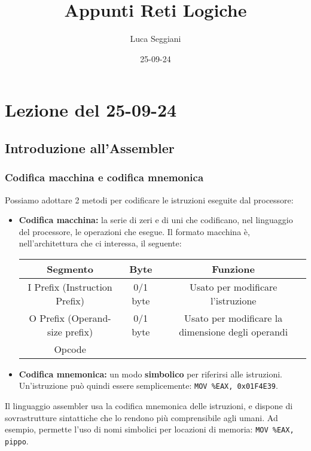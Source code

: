 \documentclass[a4paper,11pt]{article}
\title{Appunti Reti Logiche}
\author{Luca Seggiani}
\date{25-09-24}
\begin{document}
\section{Lezione del 25-09-24}

\thispagestyle{empty}
\pagestyle{fancy}

\subsection{Introduzione all'Assembler}

\subsubsection{Codifica macchina e codifica mnemonica}
Possiamo adottare 2 metodi per codificare le istruzioni eseguite dal processore:

\begin{itemize}
	\item \textbf{Codifica macchina:} la serie di zeri e di uni che codificano, nel linguaggio del processore, le operazioni che esegue.
		Il formato macchina è, nell'architettura che ci interessa, il seguente:

		\begin{table}[h!]
			\center {}
			\begin{tabular} { c | c | c }
				\bfseries Segmento & \bfseries Byte & \bfseries Funzione \\
				\hline 
				I Prefix (Instruction Prefix) & 0/1 byte & Usato per modificare l'istruzione \\ 
				O Prefix (Operand-size prefix) & 0/1 byte & Usato per modificare la dimensione degli operandi \\
				Opcode &
			\end{tabular}
		\end{table}

	\item \textbf{Codifica mnemonica:} un modo \textbf{simbolico} per riferirsi alle istruzioni.
		Un'istruzione può quindi essere semplicemente: \texttt{MOV \%EAX, 0x01F4E39}.
\end{itemize}

Il linguaggio assembler usa la codifica mnemonica delle istruzioni, e dispone di sovrastrutture sintattiche che lo rendono più comprensibile agli umani.
Ad esempio, permette l'uso di nomi simbolici per locazioni di memoria: \texttt{MOV \%EAX, pippo}.
\end{document}
